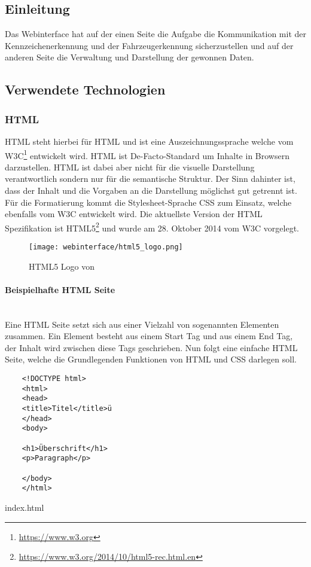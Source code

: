 \def \sectionauthors {Philipp Kraft}

\subsection{Einleitung}
Das Webinterface hat auf der einen Seite die Aufgabe die Kommunikation mit der
Kennzeichenerkennung und der Fahrzeugerkennung sicherzustellen und auf der
anderen Seite die Verwaltung und Darstellung der gewonnen Daten.

\subsection{Verwendete Technologien}
\subsubsection{HTML}
\acs*{HTML} steht hierbei für \acl*{HTML} und ist eine Auszeichnungssprache
welche vom \ac*{W3C}\footnote{\url{https://www.w3.org} } entwickelt wird.
\ac*{HTML} ist De-Facto-Standard um Inhalte in Browsern darzustellen.
\acs*{HTML} ist dabei aber nicht für die visuelle Darstellung verantwortlich
sondern nur für die semantische Struktur. Der Sinn dahinter ist, dass der Inhalt
und die Vorgaben an die Darstellung möglichst gut getrennt ist. Für die
Formatierung kommt die Stylesheet-Sprache \ac*{CSS} zum Einsatz, welche
ebenfalls vom \acl*{W3C} entwickelt wird. Die aktuellste Version der \acs*{HTML}
Spezifikation ist
HTML5\footnote{\url{https://www.w3.org/2014/10/html5-rec.html.en}} und wurde am
28. Oktober 2014 vom \acs*{W3C} vorgelegt.

\begin{figure}[H]
  \centering
  \texttt{[image: webinterface/html5\_logo.png]}
  \caption{HTML5 Logo von }
\end{figure}

\paragraph{Beispielhafte HTML Seite}\mbox{}\\
Eine \acs*{HTML} Seite setzt sich aus einer Vielzahl von sogenannten Elementen
zusammen. Ein Element besteht aus einem Start Tag und aus einem End Tag, der
Inhalt wird zwischen diese Tags geschrieben. Nun folgt eine einfache HTML Seite,
welche die Grundlegenden Funktionen von HTML und CSS darlegen soll.

\begin{listing}[H]
  \begin{verbatim}
    <!DOCTYPE html>
    <html>
    <head>
    <title>Titel</title>ü
    </head>
    <body>

    <h1>Überschrift</h1>
    <p>Paragraph</p>

    </body>
    </html>
  \end{verbatim}
  \caption{index.html}
  \label{lst:simple_html_site}
\end{listing}

